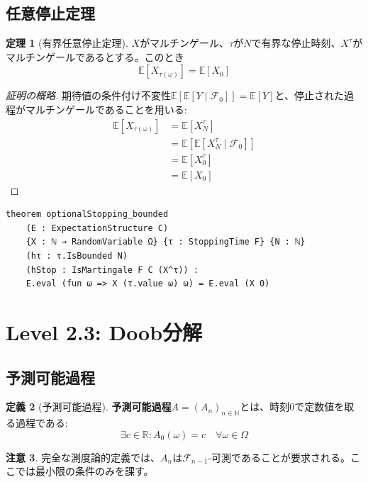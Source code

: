 \documentclass[a4paper,12pt]{ltjsarticle}
\theoremstyle{definition}
\newtheorem{definition}{定義}[section]
\newtheorem{theorem}[definition]{定理}
\newtheorem{remark}[definition]{注意}
\begin{document}
\subsection{任意停止定理}

\begin{theorem}[有界任意停止定理]
$X$がマルチンゲール、$\tau$が$N$で有界な停止時刻、$X^\tau$がマルチンゲールであるとする。このとき
\[
  \mathbb{E}[X_{\tau(\omega)}] = \mathbb{E}[X_0]
\]
\end{theorem}

\begin{proof}[証明の概略]
期待値の条件付け不変性$\mathbb{E}[\mathbb{E}[Y \mid \mathcal{F}_0]] = \mathbb{E}[Y]$と、停止された過程がマルチンゲールであることを用いる:
\begin{align*}
  \mathbb{E}[X_{\tau(\omega)}]
  &= \mathbb{E}[X^\tau_N] \\
  &= \mathbb{E}[\mathbb{E}[X^\tau_N \mid \mathcal{F}_0]] \\
  &= \mathbb{E}[X^\tau_0] \\
  &= \mathbb{E}[X_0]
\end{align*}
\end{proof}

\begin{leanbox}
\begin{verbatim}
theorem optionalStopping_bounded
    (E : ExpectationStructure C)
    {X : ℕ → RandomVariable Ω} {τ : StoppingTime F} {N : ℕ}
    (hτ : τ.IsBounded N)
    (hStop : IsMartingale F C (X^τ)) :
    E.eval (fun ω => X (τ.value ω) ω) = E.eval (X 0)
\end{verbatim}
\end{leanbox}

\section{Level 2.3: Doob分解}

\subsection{予測可能過程}

\begin{definition}[予測可能過程]
\textbf{予測可能過程}$A = (A_n)_{n \in \mathbb{N}}$とは、時刻$0$で定数値を取る過程である:
\[
  \exists c \in \mathbb{R} : A_0(\omega) = c \quad \forall \omega \in \Omega
\]
\end{definition}

\begin{remark}
完全な測度論的定義では、$A_n$は$\mathcal{F}_{n-1}$-可測であることが要求される。ここでは最小限の条件のみを課す。
\end{remark}
\end{document}
